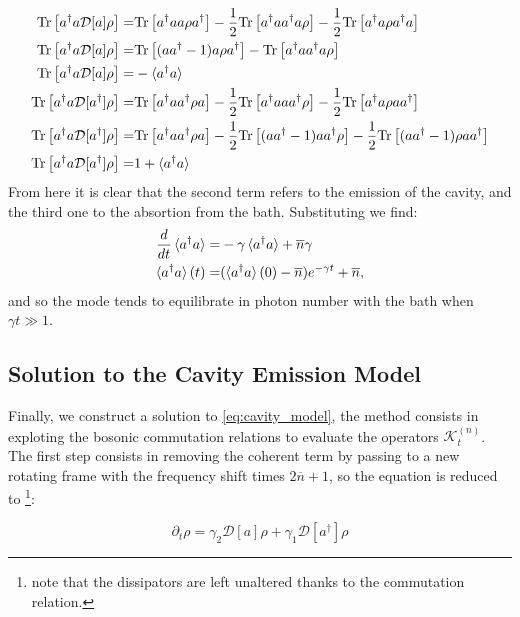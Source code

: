 \begin{align}
  \mathrm{Tr}\left[a^{\dagger}a\mathcal{D}[a]\rho\right] =& \mathrm{Tr}\left[a^{\dagger}aa\rho a^{\dagger}\right]-\frac{1}{2}\mathrm{Tr}\left[a^{\dagger}aa^{\dagger}a\rho\right]-\frac{1}{2}\mathrm{Tr}\left[a^{\dagger}a\rho a^{\dagger}a\right] \\
  \mathrm{Tr}\left[a^{\dagger}a\mathcal{D}[a]\rho\right] =& \mathrm{Tr}\left[(aa^{\dagger}-1)a\rho a^{\dagger}\right] - \mathrm{Tr}\left[a^{\dagger}aa^{\dagger}a\rho\right]\\
  \mathrm{Tr}\left[a^{\dagger}a\mathcal{D}[a]\rho\right] =&-\braket{a^{\dagger}a}\\
\mathrm{Tr}\left[a^{\dagger}a\mathcal{D}[a^{\dagger}]\rho\right] =& \mathrm{Tr}\left[a^{\dagger}aa^{\dagger}\rho a\right] - \frac{1}{2}\mathrm{Tr}\left[a^{\dagger}aaa^{\dagger}\rho\right] - \frac{1}{2}\mathrm{Tr}\left[a^{\dagger}a\rho aa^{\dagger}\right]\\
\mathrm{Tr}\left[a^{\dagger}a\mathcal{D}[a^{\dagger}]\rho\right] =& \mathrm{Tr}\left[a^{\dagger}aa^{\dagger}\rho a\right] - \frac{1}{2}\mathrm{Tr}\left[(aa^{\dagger}-1)aa^{\dagger}\rho\right] - \frac{1}{2}\mathrm{Tr}\left[(aa^{\dagger}-1)\rho aa^{\dagger}\right]\\
\mathrm{Tr}\left[a^{\dagger}a\mathcal{D}[a^{\dagger}]\rho\right] =& 1+ \braket{a^{\dagger}a}
\end{align}
From here it is clear that the second term refers to the emission of the cavity, and the third one to the absortion from the bath. Substituting
we find:
\begin{align}
  \frac{d}{dt}\braket{a^{\dagger}a} = &-\gamma\braket{a^{\dagger}a} + \overline{n}\gamma\\
  \braket{a^{\dagger}a}(t) =& (\braket{a^{\dagger}a}(0)-\overline{n})e^{-\gamma t} + \overline{n},
\end{align}
and so the mode tends to equilibrate in photon number with the bath when $\gamma t\gg 1$.
\subsection{Solution to the Cavity Emission Model}
Finally, we construct a solution to \eqref{eq:cavity_model}, the method consists in exploting the bosonic commutation relations
to evaluate the operators $\mathcal{K}^{(n)}_{t}$. The first step consists in removing the coherent term by passing to a new rotating frame
with the frequency shift times $2\overline{n}+1$, so the equation is reduced to \footnote{note that the dissipators are left unaltered thanks to the commutation relation.}:

\begin{equation}
\partial_{t}\rho = \gamma_{2}\mathcal{D}[a]\rho + \gamma_{1}\mathcal{D}[a^{\dagger}]\rho
\end{equation}

